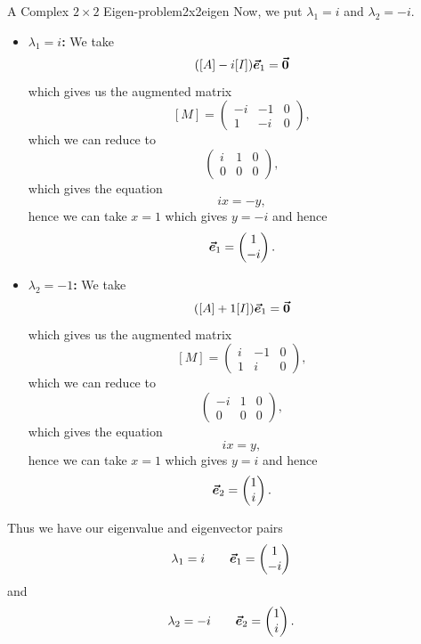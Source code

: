 \begin{ex}{A Complex $2\times 2$ Eigen-problem}{2x2eigen}
         Now, we put $\lambda_1=i$ and $\lambda_2=-i$.
         \begin{itemize}
             \item \textbf{$\lambda_1=i$:} We take
             \[
             ([A]-i[I])\boldsymbol{\vec{e}}_1 = \boldsymbol{\vec{0}}
             \]
             which gives us the augmented matrix
             \[
             [M] =\left( \begin{array}{cc|c} -i & -1 & 0\\ 1 & -i &0 \end{array}\right),
             \]
             which we can reduce to
             \[
             \left( \begin{array}{cc|c} i & 1 & 0\\ 0 & 0 & 0 \end{array}\right),
             \]
             which gives the equation 
             \[
             ix=-y,
             \]
             hence we can take $x=1$ which gives $y=-i$ and hence
             \[
             \boldsymbol{\vec{e}}_1 = \begin{pmatrix} 1 \\ -i \end{pmatrix}.
             \]
             \item \textbf{$\lambda_2=-1$:} We take
             \[
             ([A]+1[I])\boldsymbol{\vec{e}}_1 = \boldsymbol{\vec{0}}
             \]
             which gives us the augmented matrix
             \[
             [M] =\left( \begin{array}{cc|c} i & -1 & 0\\ 1 & i &0 \end{array}\right),
             \]
             which we can reduce to
             \[
             \left( \begin{array}{cc|c} -i & 1 & 0\\ 0 & 0 & 0 \end{array}\right),
             \]
             which gives the equation 
             \[
             ix=y,
             \]
             hence we can take $x=1$ which gives $y=i$ and hence
             \[
             \boldsymbol{\vec{e}}_2 = \begin{pmatrix} 1 \\ i \end{pmatrix}.
             \]
         \end{itemize}
         Thus we have our eigenvalue and eigenvector pairs
         \[
         \lambda_1 = i \qquad \boldsymbol{\vec{e}}_1 = \begin{pmatrix} 1 \\ -i \end{pmatrix}
         \]
         and
         \[
         \lambda_2 = -i \qquad \boldsymbol{\vec{e}}_2 = \begin{pmatrix} 1 \\ i \end{pmatrix}.
         \]
        \end{ex}
        
